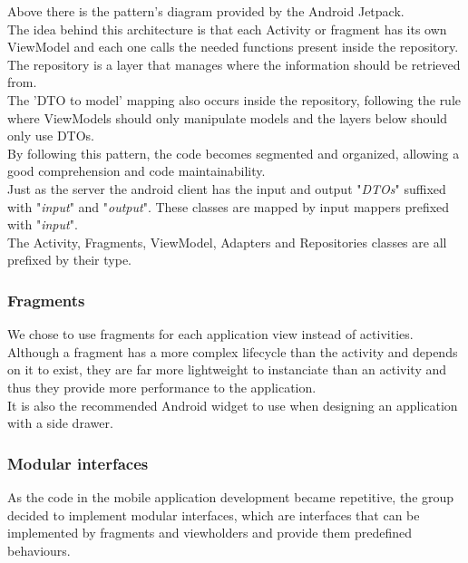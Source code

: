 Above there is the pattern's diagram provided by the Android Jetpack.\\

The idea behind this architecture is that each Activity or fragment has its own ViewModel and each one calls the needed functions present inside the repository.
The repository is a layer that manages where the information should be retrieved from.\\

The 'DTO to model' mapping also occurs inside the repository, following the rule where ViewModels should only manipulate models and the layers below should only use DTOs.\\

By following this pattern, the code becomes segmented and organized, allowing a good comprehension and code maintainability.\\

Just as the server the android client has the input and output "\textit{DTOs}" suffixed with "\textit{input}" and "\textit{output}". 
These classes are mapped by input mappers prefixed with "\textit{input}".\\

The Activity, Fragments, ViewModel, Adapters and Repositories classes are all prefixed by their type.

\subsubsection{Fragments}

We chose to use fragments\cite{fragment} for each application view instead of activities. Although a fragment has a more complex lifecycle than the activity and depends on it
to exist, they are far more lightweight to instanciate than an activity and thus they provide more performance to the application.\\ 

It is also the recommended Android widget to use when designing an application with a side drawer.\\

\subsubsection{Modular interfaces}

As the code in the mobile application development became repetitive, the group decided to implement modular interfaces,
which are interfaces that can be implemented by fragments and viewholders and provide them predefined behaviours.

